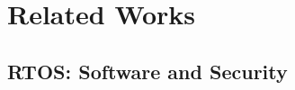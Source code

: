 \chapter{\leavevmode Related Works}
\label{chap:relatedworks}



\section{RTOS: Software and Security}  \label{rtossoftwaresecurity}

